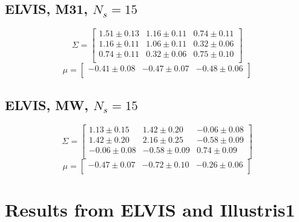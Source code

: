 \documentclass[a4paper,fleqn,usenatbib]{mnras}
\begin{document}
\subsection{ELVIS, M31, $N_s=15$}
\[
\Sigma=
\begin{bmatrix}
1.51 \pm 0.13 & 1.16 \pm 0.11 & 0.74 \pm 0.11\\
1.16 \pm 0.11 & 1.06 \pm 0.11 & 0.32 \pm 0.06\\
0.74 \pm 0.11 & 0.32 \pm 0.06 & 0.75 \pm 0.10\\
\end{bmatrix}
\]
\[
\mu=
\begin{bmatrix}
-0.41 \pm 0.08 & -0.47 \pm 0.07 & -0.48 \pm 0.06\\
\end{bmatrix}
\]
\subsection{ELVIS, MW, $N_s=15$}
\[
\Sigma=
\begin{bmatrix}
1.13 \pm 0.15 & 1.42 \pm 0.20 & -0.06 \pm 0.08\\
1.42 \pm 0.20 & 2.16 \pm 0.25 & -0.58 \pm 0.09\\
-0.06 \pm 0.08 & -0.58 \pm 0.09 & 0.74 \pm 0.09\\
\end{bmatrix}
\]
\[
\mu=
\begin{bmatrix}
-0.47 \pm 0.07 & -0.72 \pm 0.10 & -0.26 \pm 0.06\\
\end{bmatrix}
\]




\section{Results from ELVIS and Illustris1}
\label{appendix:plots}
\end{document}
